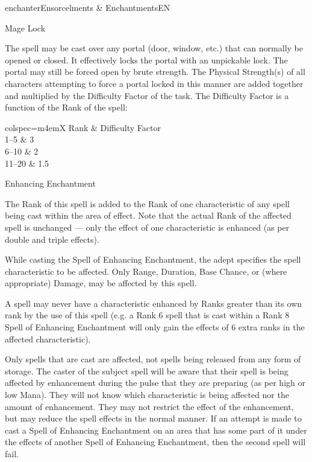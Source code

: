 \begin{College}[1.1]{enchanter}{Ensorcelments \& Enchantments}{EN}
\begin{spell}[S-6]{Mage Lock}

\begin{effects}
The spell may be cast over any portal (door, window, etc.)  that can
normally be opened or closed.  It effectively locks the portal with an
unpickable lock.  The portal may still be forced open by brute
strength.  The Physical Strength(s) of all characters attempting to
force a portal locked in this manner are added together and multiplied
by the Difficulty Factor of the task.  The Difficulty Factor is a
function of the Rank of the spell:
\begin{dqtblr}{colspec={m{4em}X}}
Rank	& Difficulty Factor \\
1--5	& 3 \\
6--10	& 2 \\ 
11--20	& 1.5 \\
\end{dqtblr}
\end{effects}
\end{spell}

\begin{spell}[S-7]{Enhancing Enchantment}
\begin{effects}
The Rank of this spell is added to the Rank of one characteristic of
any spell being cast within the area of effect. Note that the actual
Rank of the affected spell is unchanged --- only the effect of one
characteristic is enhanced (as per double and triple effects).

While casting the Spell of Enhancing Enchantment, the adept specifies
the spell characteristic to be affected.  Only Range, Duration, Base
Chance, or (where appropriate) Damage, may be affected by this spell.

A spell may never have a characteristic enhanced by Ranks greater than
its own rank by the use of this spell (e.g. a Rank 6 spell that is
cast within a Rank 8 Spell of Enhancing Enchantment will only gain the
effects of 6 extra ranks in the affected characteristic).

Only spells that are cast are affected, not spells being released from
any form of storage.  The caster of the subject spell will be aware
that their spell is being affected by enhancement during the pulse
that they are preparing (as per high or low Mana). They will not know
which characteristic is being affected nor the amount of enhancement.
They may not restrict the effect of the enhancement, but may reduce
the spell effects in the normal manner. If an attempt is made to
cast a Spell of Enhancing Enchantment on an area that has some part of
it under the effects of another Spell of Enhancing Enchantment, then
the second spell will fail.


\end{effects}
\end{spell}
\end{College}

